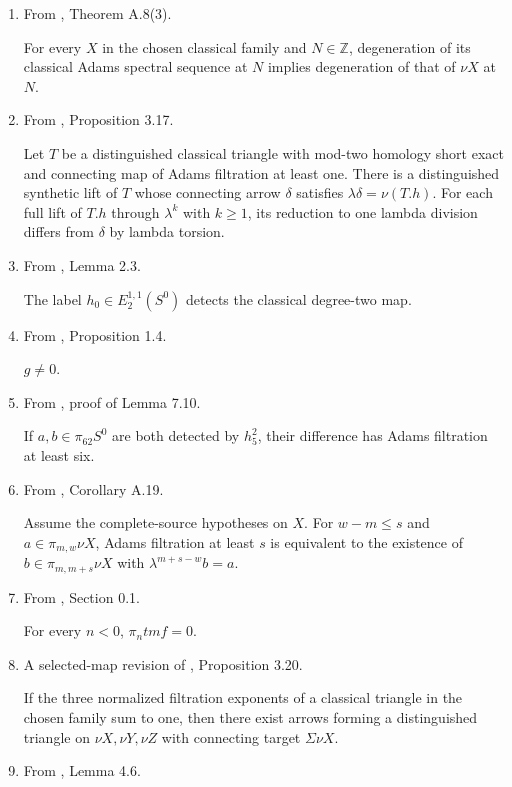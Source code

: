 \begin{theorem}
\begin{enumerate}
The realization of the normalized synthetic $\eta\in\pi_{1,2}S^{0,0}$ is the classical Hopf map $\eta$.
\item From \cite{BHS}, Theorem A.8(3).\par

For every $X$ in the chosen classical family and $N\in\mathbb Z$, degeneration of its classical Adams spectral sequence at $N$ implies degeneration of that of $\nu X$ at $N$.
\item From \cite{LWX126}, Proposition 3.17.\par

Let $T$ be a distinguished classical triangle with mod-two homology short exact and connecting map of Adams filtration at least one. There is a distinguished synthetic lift of $T$ whose connecting arrow $\delta$ satisfies $\lambda\delta=\nu(T.h)$. For each full lift of $T.h$ through $\lambda^k$ with $k\ge1$, its reduction to one lambda division differs from $\delta$ by lambda torsion.
\item From \cite{Adams58}, Lemma 2.3.\par

The label $h_0\in E_2^{1,1}(S^0)$ detects the classical degree-two map.
\item From \cite{BR21}, Proposition 1.4.\par

$g\ne0$.
\item From \cite{LWX126}, proof of Lemma 7.10.\par

If $a,b\in\pi_{62}S^0$ are both detected by $h_5^2$, their difference has Adams filtration at least six.
\item From \cite{BHS}, Corollary A.19.\par

Assume the complete-source hypotheses on $X$. For $w-m\le s$ and $a\in\pi_{m,w}\nu X$, Adams filtration at least $s$ is equivalent to the existence of $b\in\pi_{m,m+s}\nu X$ with $\lambda^{m+s-w}b=a$.
\item From \cite{BR21}, Section 0.1.\par

For every $n<0$, $\pi_n\mathit{tmf}=0$.
\item A selected-map revision of \cite{LWX126}, Proposition 3.20.\par

If the three normalized filtration exponents of a classical triangle in the chosen family sum to one, then there exist arrows forming a distinguished triangle on $\nu X,\nu Y,\nu Z$ with connecting target $\Sigma\nu X$.
\item From \cite{May01}, Lemma 4.6.\par


\end{enumerate}
\end{theorem}
